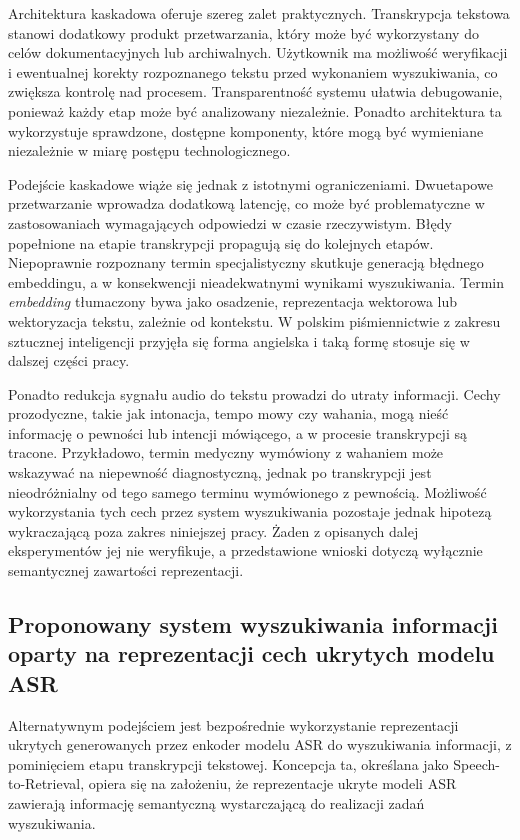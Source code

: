 Architektura kaskadowa oferuje szereg zalet praktycznych. Transkrypcja tekstowa stanowi dodatkowy produkt przetwarzania, który może być wykorzystany do celów dokumentacyjnych lub archiwalnych. Użytkownik ma możliwość weryfikacji i ewentualnej korekty rozpoznanego tekstu przed wykonaniem wyszukiwania, co zwiększa kontrolę nad procesem. Transparentność systemu ułatwia debugowanie, ponieważ każdy etap może być analizowany niezależnie. Ponadto architektura ta wykorzystuje sprawdzone, dostępne komponenty, które mogą być wymieniane niezależnie w miarę postępu technologicznego.

Podejście kaskadowe wiąże się jednak z istotnymi ograniczeniami. Dwuetapowe przetwarzanie wprowadza dodatkową latencję, co może być problematyczne w zastosowaniach wymagających odpowiedzi w czasie rzeczywistym. Błędy popełnione na etapie transkrypcji propagują się do kolejnych etapów. Niepoprawnie rozpoznany termin specjalistyczny skutkuje generacją błędnego embeddingu, a w konsekwencji nieadekwatnymi wynikami wyszukiwania. Termin \textit{embedding} tłumaczony bywa jako osadzenie, reprezentacja wektorowa lub wektoryzacja tekstu, zależnie od kontekstu. W polskim piśmiennictwie z zakresu sztucznej inteligencji przyjęła się forma angielska i taką formę stosuje się w dalszej części pracy.

Ponadto redukcja sygnału audio do tekstu prowadzi do utraty informacji. Cechy prozodyczne, takie jak intonacja, tempo mowy czy wahania, mogą nieść informację o pewności lub intencji mówiącego, a w procesie transkrypcji są tracone. Przykładowo, termin medyczny wymówiony z wahaniem może wskazywać na niepewność diagnostyczną, jednak po transkrypcji jest nieodróżnialny od tego samego terminu wymówionego z pewnością. Możliwość wykorzystania tych cech przez system wyszukiwania pozostaje jednak hipotezą wykraczającą poza zakres niniejszej pracy. Żaden z opisanych dalej eksperymentów jej nie weryfikuje, a przedstawione wnioski dotyczą wyłącznie semantycznej zawartości reprezentacji.

\subsection{Proponowany system wyszukiwania informacji oparty na reprezentacji cech ukrytych modelu ASR}
\label{sec:s2r}

Alternatywnym podejściem jest bezpośrednie wykorzystanie reprezentacji ukrytych generowanych przez enkoder modelu ASR do wyszukiwania informacji, z pominięciem etapu transkrypcji tekstowej. Koncepcja ta, określana jako Speech-to-Retrieval, opiera się na założeniu, że reprezentacje ukryte modeli ASR zawierają informację semantyczną wystarczającą do realizacji zadań wyszukiwania.

